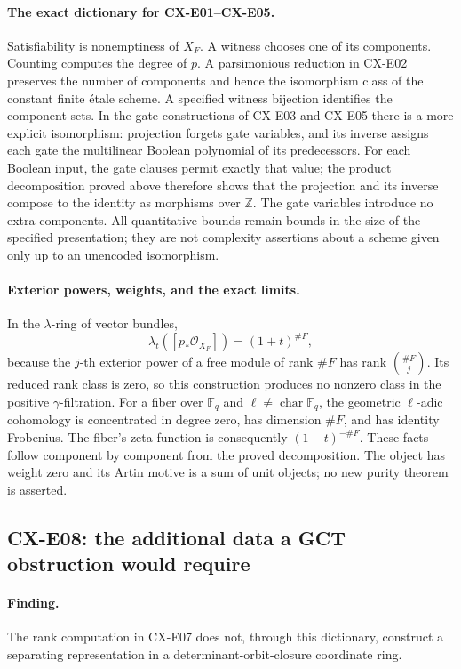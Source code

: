 \paragraph{The exact dictionary for CX-E01--CX-E05.}
Satisfiability is nonemptiness of \(X_F\).
A witness chooses one of its components.
Counting computes the degree of \(p\).
A parsimonious reduction in CX-E02 preserves the number of components
and hence the isomorphism class of the constant finite étale scheme.
A specified witness bijection identifies the component sets.
In the gate constructions of CX-E03 and CX-E05 there is a more
explicit isomorphism: projection forgets gate variables, and its
inverse assigns each gate the multilinear Boolean polynomial of
its predecessors.
For each Boolean input, the gate clauses permit exactly that value;
the product decomposition proved above therefore shows that the
projection and its inverse compose to the identity as morphisms
over \(\mathbb Z\).
The gate variables introduce no extra components.
All quantitative bounds remain bounds in the size of the specified
presentation; they are not complexity assertions about a scheme
given only up to an unencoded isomorphism.

\paragraph{Exterior powers, weights, and the exact limits.}
In the \(\lambda\)-ring of vector bundles,
\[
 \lambda_t([p_*\mathcal O_{X_F}])=(1+t)^{\#F},
\]
because the \(j\)-th exterior power of a free module of rank \(\#F\)
has rank \(\binom{\#F}{j}\).
Its reduced rank class is zero, so this construction produces no
nonzero class in the positive \(\gamma\)-filtration.
For a fiber over \(\mathbb F_q\) and \(\ell\ne\operatorname{char}\mathbb F_q\),
the geometric \(\ell\)-adic cohomology is concentrated in degree zero,
has dimension \(\#F\), and has identity Frobenius.
The fiber's zeta function is consequently
\((1-t)^{-\#F}\).
These facts follow component by component from the proved
decomposition. The object has weight zero and its Artin motive is
a sum of unit objects; no new purity theorem is asserted.

\subsection{CX-E08: the additional data a GCT obstruction would require}
\label{finding:CX-E08}

\paragraph{Finding.}
The rank computation in CX-E07 does not, through this dictionary,
construct a separating representation in a determinant-orbit-closure
coordinate ring.


